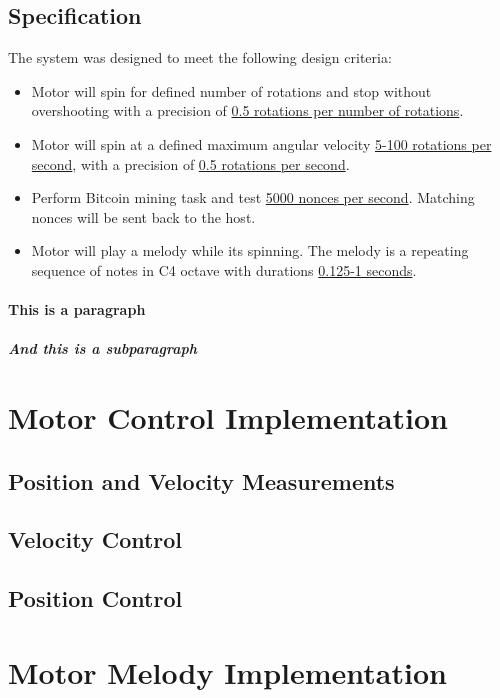 \documentclass{article}
\begin{document}
\subsection{Specification}
\noindent The system was designed to meet the following design criteria:
 \begin{itemize}
	\item Motor will spin for defined number of rotations and stop without overshooting with a precision of \underline{0.5 rotations per number of rotations}.
	\item Motor will spin at a defined maximum angular velocity \underline{5-100 rotations per second}, with a precision of \underline{0.5 rotations per second}.
	\item Perform Bitcoin mining task and test \underline{5000 nonces per second}. Matching nonces will be sent back to the host.
	\item Motor will play a melody while its spinning. The melody is a repeating sequence of notes in C4 octave with durations \underline{0.125-1 seconds}.
\end{itemize}

\paragraph{This is a paragraph}
\lipsum[2]

\subparagraph{And this is a subparagraph}
\lipsum[3]




\section{Motor Control Implementation}
\subsection{Position and Velocity Measurements}

\subsection{Velocity Control}

\subsection{Position Control}


\section{Motor Melody Implementation}
\end{document}
